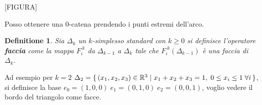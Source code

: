 \documentclass{article}
\newtheorem{definition}[theorem]{Definitione}
\newcommand{\RN}[1][]{\mathbb{R}^#1}
\begin{document}
[FIGURA]

Posso ottenere una $ 0 $-catena prendendo i punti estremi dell'arco.

\begin{definition}
  Sia $ \Delta_k $ un $ k $-simplesso standard con $ k \geq 0 $ si definisce l'operatore \textbf{faccia} come
  la mappa $ F_i^{\;k} $ da $ \Delta_{k-1} $ a $ \Delta_k $ tale che $ F_i^{\;k}(\Delta_{k-1}) $ è una faccia di $ \Delta_k $.
\end{definition}

Ad esempio per $ k = 2 $ $ \Delta_2 = \set{ (x_1,x_2,x_3) \in \RN{3} | x_1 + x_2 + x_3 = 1, \; 0 \leq x_i \leq 1 \; \forall i} $,
si definisce la base $ e_0 = (1,0,0) \; e_1 = (0,1,0) \; e_2 = (0,0,1) $, voglio vedere il bordo del triangolo
come facce.
\end{document}
